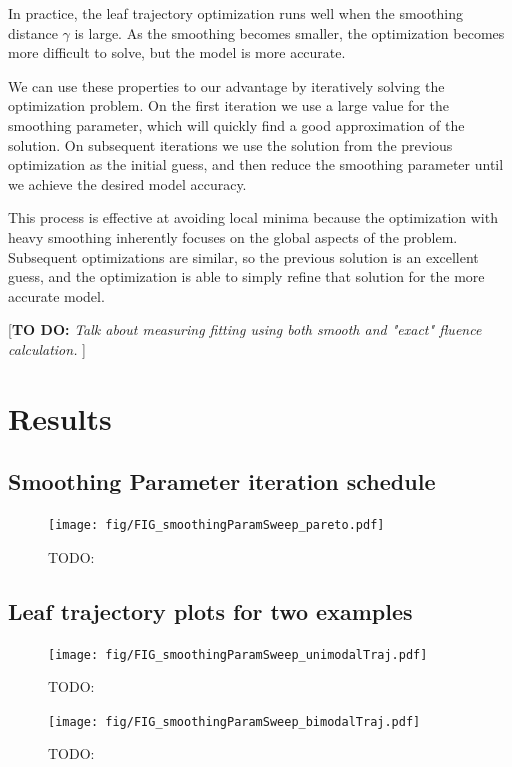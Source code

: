 \documentclass[12pt]{article}
\newcommand{\todo}[1]{{\color{lightblue}\par {[{\bf TO DO: } {\em #1}} ] \\    }}
\begin{document}
In practice, the leaf trajectory optimization runs well 
when the smoothing distance $\gamma$ is large.
As the smoothing becomes smaller, the optimization becomes more difficult to solve,
but the model is more accurate.

We can use these properties to our advantage by iteratively solving the optimization problem.
On the first iteration we use a large value for the smoothing parameter,
which will quickly find a good approximation of the solution.
On subsequent iterations we use the solution from the previous optimization as the initial guess,
and then reduce the smoothing parameter until we achieve the desired model accuracy.

This process is effective at avoiding local minima because
the optimization with heavy smoothing inherently focuses on the global aspects of the problem.
Subsequent optimizations are similar, so the previous solution is an excellent guess,
and the optimization is able to simply refine that solution for the more accurate model.

\todo{Talk about measuring fitting using both smooth and "exact" fluence calculation.}

\section{Results}

\subsection{Smoothing Parameter iteration schedule}

\begin{figure}
  \centering
  \texttt{[image: fig/FIG\_smoothingParamSweep\_pareto.pdf]}
  \caption{TODO:}
  \label{fig:smoothingParamSweep_pareto}
\end{figure}


\subsection{Leaf trajectory plots for two examples}


\begin{figure}
  \centering
  \texttt{[image: fig/FIG\_smoothingParamSweep\_unimodalTraj.pdf]}
  \caption{TODO:}
  \label{fig:smoothingParamSweep_unimodalTraj}
\end{figure}


\begin{figure}
  \centering
  \texttt{[image: fig/FIG\_smoothingParamSweep\_bimodalTraj.pdf]}
  \caption{TODO:}
  \label{fig:smoothingParamSweep_bimodalTraj}
\end{figure}
\end{document}
